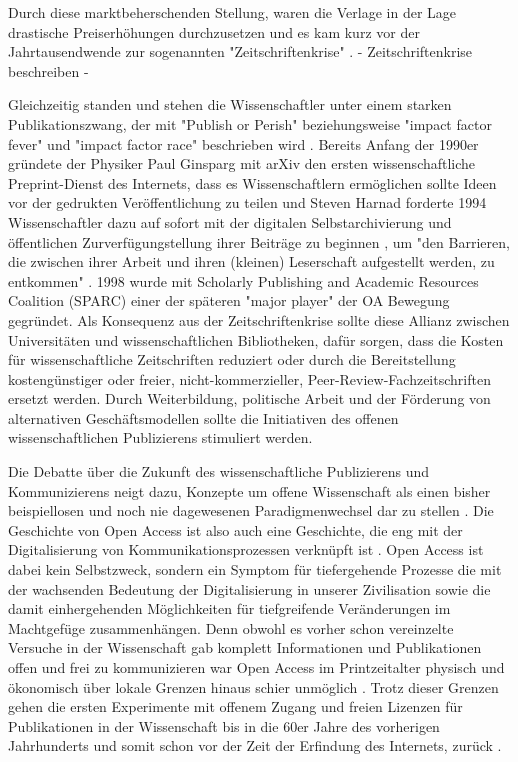 Durch diese marktbeherschenden Stellung, waren die Verlage in der Lage drastische Preiserhöhungen durchzusetzen und es kam kurz vor der Jahrtausendwende zur sogenannten "Zeitschriftenkrise" \cite{suchen}. 
- Zeitschriftenkrise beschreiben -

Gleichzeitig standen und stehen die Wissenschaftler unter einem starken Publikationszwang, der mit "Publish or Perish" \cite{CLAPHAM_2005} beziehungsweise "impact factor fever" \cite{Cherubini_2008} und "impact factor race" \cite{Brischoux_2009} beschrieben wird \cite{offhaus_2012_institutionelle_repos}. Bereits Anfang der 1990er gründete der Physiker Paul Ginsparg mit arXiv den ersten wissenschaftliche Preprint-Dienst des Internets, dass es Wissenschaftlern ermöglichen sollte Ideen vor der gedrukten Veröffentlichung zu teilen und Steven Harnad forderte 1994 Wissenschaftler dazu auf sofort mit der digitalen Selbstarchivierung und öffentlichen Zurverfügungstellung ihrer Beiträge zu beginnen \cite{albert_2006_open_implications}, um "den Barrieren, die zwischen ihrer Arbeit und ihren (kleinen) Leserschaft aufgestellt werden, zu entkommen" \cite{harnad_1995_subversive_proposal}. 1998 wurde mit Scholarly Publishing and Academic Resources Coalition (SPARC) einer der späteren "major player" der OA Bewegung\cite{russell2008business} gegründet. Als Konsequenz aus der Zeitschriftenkrise sollte diese Allianz zwischen Universitäten und wissenschaftlichen Bibliotheken, dafür sorgen, dass die Kosten für wissenschaftliche Zeitschriften reduziert oder durch die Bereitstellung kostengünstiger oder freier, nicht-kommerzieller, Peer-Review-Fachzeitschriften ersetzt werden. Durch Weiterbildung, politische Arbeit und der Förderung von alternativen Geschäftsmodellen sollte die Initiativen des offenen wissenschaftlichen Publizierens stimuliert werden\cite{suchen}.

Die Debatte über die Zukunft des wissenschaftliche Publizierens und Kommunizierens neigt dazu, Konzepte um offene Wissenschaft als einen bisher beispiellosen und noch nie dagewesenen Paradigmenwechsel dar zu stellen \cite{cite:17a} \cite{cite:17b}. Die Geschichte von Open Access ist also auch eine Geschichte, die eng mit der Digitalisierung von Kommunikationsprozessen verknüpft ist \cite{albert_2006_open_implications}. Open Access ist dabei kein Selbstzweck\cite{cite:17d}, sondern ein Symptom für tiefergehende Prozesse die mit der wachsenden Bedeutung der Digitalisierung in unserer Zivilisation sowie die damit einhergehenden Möglichkeiten für tiefgreifende Veränderungen im Machtgefüge zusammenhängen\cite{cite:17e}. Denn obwohl es vorher schon vereinzelte Versuche in der Wissenschaft gab komplett Informationen und Publikationen offen und frei zu kommunizieren war Open Access im Printzeitalter physisch und ökonomisch über lokale Grenzen hinaus schier unmöglich \cite{cite:18a}. Trotz dieser Grenzen gehen die ersten Experimente mit offenem Zugang und freien Lizenzen für Publikationen in der Wissenschaft bis in die 60er Jahre des vorherigen Jahrhunderts und somit schon vor der Zeit der Erfindung des Internets, zurück \cite{cite:18b}. 

